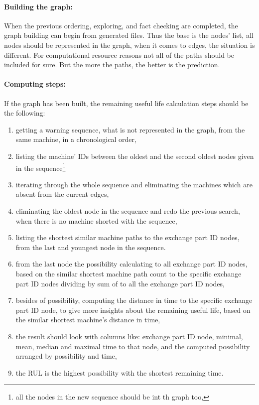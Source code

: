 			\paragraph{Building the graph:}
			When the previous ordering, exploring, and fact checking are completed, the graph building can begin from generated files. Thus the base is the nodes' list, all nodes should be represented in the graph, when it comes to edges, the situation is different. For computational resource reasons not all of the paths should be included for sure. But the more the paths, the better is the prediction.
\clearpage\paragraph{Computing steps:}
			If the graph has been built, the remaining useful life calculation steps should be the following:
			\begin{enumerate}
				\item{getting a warning sequence, what is not represented in the graph, from the same machine, in a chronological order,}
				\item{listing the machine' IDs between the oldest and the second oldest nodes given in the sequence}\footnote{all the nodes in the new sequence should be int th graph too,} 
				\item{iterating through the whole sequence and eliminating the machines which are absent from the current edges,}
				\item{eliminating the oldest node in the sequence and redo the previous search, when there is no machine shorted with the sequence,}
				\item{listing the shortest similar machine paths to the exchange part ID nodes, from the last and youngest node in the sequence.}
				\item{from the last node the possibility calculating to all exchange part ID nodes, based on the similar shortest machine path count to the specific exchange part ID nodes dividing by sum of to all the exchange part ID nodes,}
				\item{besides of possibility, computing the distance in time  to the specific exchange part ID node, to give more insights about the remaining useful life, based on the similar shortest machine's distance in time,}
				\item{the result should look with columns like: exchange part ID node, minimal, mean, median and maximal time to that node, and the computed possibility arranged by possibility and time,} 
		 		\item{the RUL is the highest possibility with the shortest remaining time.}
		 	\end{enumerate}
		
